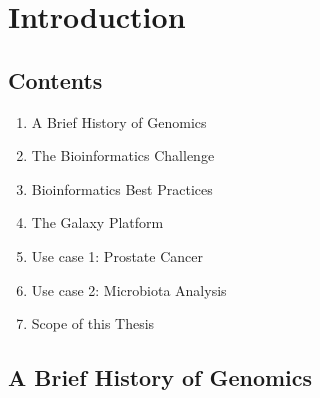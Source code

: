 \chapter{Introduction}
\label{introduction}
\setcounter{figure}{-1}
\setcounter{table}{-1}
\setcounter{section}{-1}
\setcounter{NAT@ctr}{-1}

\setlength\parindent{0pt}

\section*{Contents}

\begin{enumerate}
\itemsep-0.5em
\item A Brief History of Genomics
\item The Bioinformatics Challenge
\item Bioinformatics Best Practices
\item The Galaxy Platform
\item Use case 1: Prostate Cancer
\item Use case 2: Microbiota Analysis
\item Scope of this Thesis
\end{enumerate}

\section{A Brief History of Genomics}

